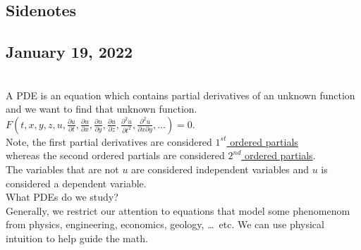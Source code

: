\subsection*{Sidenotes}
\subsection*{January 19, 2022}
\\
A PDE is an equation which contains partial derivatives of an unknown function and we want to find that unknown function.\\
\Ex $F(t, x, y, z, u, \frac{\partial u}{\partial t}, \frac{\partial u}{\partial x}, \frac{\partial u}{\partial y}, \frac{\partial u}{\partial z}, \frac{\partial^2 u}{\partial t^2}, \frac{\partial^2 u}{\partial x \partial y}, \ldots) = 0$.\\
Note, the first partial derivatives are considered \underline{$1^{st}$ ordered partials}\\
whereas the second ordered partials are considered \underline{$2^{nd}$ ordered partials}.\\
The variables that are not $u$ are considered independent variables and $u$ is considered a dependent variable.\\
What PDEs do we study?\\
Generally, we restrict our attention to equations that model some phenomenom from physics, engineering, economics, geology, \ldots\ etc. We can use physical intuition to help guide the math.\\
